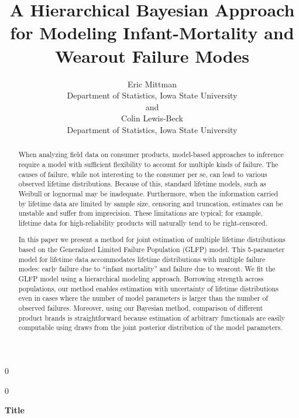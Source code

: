 \documentclass[12pt]{article}
\newcommand{\blind}{0}
\begin{document}
\def\spacingset#1{\renewcommand{\baselinestretch}%
{#1}\small\normalsize} \spacingset{1}



\blind
{
  \title{\bf A Hierarchical Bayesian Approach for Modeling Infant-Mortality and Wearout Failure Modes}
  \author{Eric Mittman \\
    Department of Statistics, Iowa State University\\
    and \\
    Colin Lewis-Beck \\
    Department of Statistics, Iowa State University}
  \maketitle
} \fi

\blind
{
  \bigskip
  \bigskip
  \bigskip
  \begin{center}
    {\LARGE\bf Title}
\end{center}
  \medskip
} \fi

\bigskip
\begin{abstract}
When analyzing field data on consumer products, model-based approaches to inference require a model with sufficient flexibility to account for multiple kinds of failure. The causes of failure, while not interesting to the consumer per se, can lead to various observed lifetime distributions. Because of this, standard lifetime models, such as Weibull or lognormal may be inadequate. 
Furthermore, when the information carried by lifetime data are limited by sample size, censoring and truncation, estimates can be unstable and suffer from imprecision. These limitations are typical; for example, lifetime data for high-reliability products will naturally tend to be right-censored.


In this paper we present a method for joint estimation of multiple lifetime distributions based on the Generalized Limited Failure Population (GLFP) model. This 5-parameter model for lifetime data accommodates lifetime distributions with multiple failure modes:  early failure due to ``infant mortality'' and failure due to wearout. We fit the GLFP model using a hierarchical modeling approach.  Borrowing strength across populations, our method enables estimation with uncertainty of lifetime distributions even in cases where the number of model parameters is larger than the number of observed failures.  Moreover, using our Bayesian method, comparison of different product brands is straightforward because estimation of arbitrary functionals are easily computable using draws from the joint posterior distribution of the model parameters.
\end{abstract}
\end{document}
